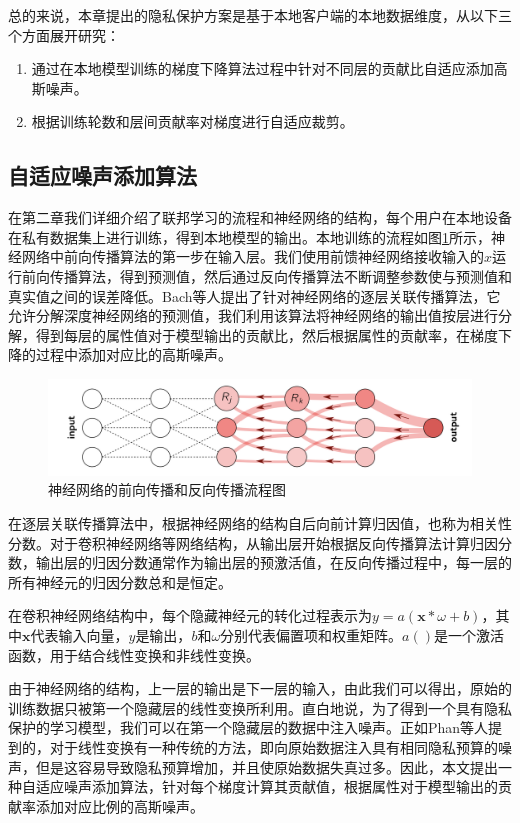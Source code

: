 总的来说，本章提出的隐私保护方案是基于本地客户端的本地数据维度，从以下三个方面展开研究：
\begin{enumerate}
\item [(1)] 通过在本地模型训练的梯度下降算法过程中针对不同层的贡献比自适应添加高斯噪声。
\item [(2)] 根据训练轮数和层间贡献率对梯度进行自适应裁剪。
\end{enumerate}

\subsection{自适应噪声添加算法}
在第二章我们详细介绍了联邦学习的流程和神经网络的结构，每个用户在本地设备在私有数据集上进行训练，得到本地模型的输出。本地训练的流程如图\ref{fig:神经网络的前向传播和反向传播流程图}所示，神经网络中前向传播算法的第一步在输入层。我们使用前馈神经网络接收输入的$x$运行前向传播算法，得到预测值，然后通过反向传播算法不断调整参数使与预测值和真实值之间的误差降低。Bach等人提出了针对神经网络的逐层关联传播算法，它允许分解深度神经网络的预测值，我们利用该算法将神经网络的输出值按层进行分解，得到每层的属性值对于模型输出的贡献比，然后根据属性的贡献率，在梯度下降的过程中添加对应比的高斯噪声。

\begin{figure}[!hbt]
\centering
	\includegraphics[scale=0.45]{fig2/C3/逐层关联传播算法}%
	\caption{神经网络的前向传播和反向传播流程图}
	\label{fig:神经网络的前向传播和反向传播流程图}	
\end{figure}

在逐层关联传播算法中，根据神经网络的结构自后向前计算归因值，也称为相关性分数。对于卷积神经网络等网络结构，从输出层开始根据反向传播算法计算归因分数，输出层的归因分数通常作为输出层的预激活值，在反向传播过程中，每一层的所有神经元的归因分数总和是恒定。

在卷积神经网络结构中，每个隐藏神经元的转化过程表示为$y=a(\mathbf{x} * \omega+b)$，其中$\mathbf{x}$代表输入向量，$y$是输出，$b$和$\omega$分别代表{}偏置项和权重矩阵。$a()$是一个激活函数，用于结合线性变换和非线性变换。

由于神经网络的结构，上一层的输出是下一层的输入，由此我们可以得出，原始的训练数据只被第一个隐藏层的线性变换所利用。直白地说，为了得到一个具有隐私保护的学习模型，我们可以在第一个隐藏层的数据中注入噪声。正如Phan等人提到的，对于线性变换有一种传统的方法，即向原始数据注入具有相同隐私预算的噪声，但是这容易导致隐私预算增加，并且使原始数据失真过多。因此，本文提出一种自适应噪声添加算法，针对每个梯度计算其贡献值，根据属性对于模型输出的贡献率添加对应比例的高斯噪声。

